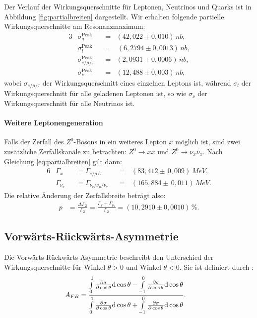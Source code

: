 Der Verlauf der Wirkungsquerschnitte für Leptonen, Neutrinos und Quarks ist in Abbildung \ref{fig:partialbreiten} dargestellt. Wir erhalten folgende partielle Wirkungsquerschnitte am Resonanzmaximum:
\begin{alignat}{3}
	&\sigma_q^\text{Peak}&&=&(42,022\pm0,010)\,\si{nb}\text{,}\\
	&\sigma_l^\text{Peak}&&=&\,(6,2794\pm0,0013)\,\si{nb}\text{,}\\
	&\sigma_{e/\mu/\tau}^\text{Peak}&&=&(2,0931\pm0,0006)\,\si{nb}\text{,}\\
	&\sigma_\nu^\text{Peak}&&=&(12,488\pm0,003)\,\si{nb}\text{,}
\end{alignat}
wobei $\sigma_{e/\mu/\tau}$ der Wirkungsquerschnitt eines einzelnen Leptons ist, während $\sigma_{l}$ der Wirkungsquerschnitt für alle geladenen Leptonen ist, so wie $\sigma_\nu$ der Wirkungsquerschnitt für alle Neutrinos ist.

\paragraph{Weitere Leptonengeneration} Falls der Zerfall des $Z^0$-Bosons in ein weiteres Lepton $x$ möglich ist, sind zwei zusätzliche Zerfallskanäle zu betrachten: $Z^0\rightarrow x\bar x$ und $Z^0\rightarrow \nu_x\bar{\nu}_x$. Nach Gleichung \ref{eq:partialbreiten} gilt dann:
\begin{alignat}{6}
	&\Gamma_x&&=\Gamma_{e/\mu/\tau}&&=&\,(83,412\pm\,0,009)\,\si{MeV}\text{,}\\
	&\Gamma_{\nu_x}&&=\Gamma_{\nu_e/\nu_\mu/\nu_\tau}&&=&\,(165,884\pm\,0,011)\,\si{MeV}\text{.}
\end{alignat}
Die relative Änderung der Zerfallsbreite beträgt also:
\begin{align}
	p&=\frac{\Delta\Gamma_Z}{\Gamma_Z}=\frac{\Gamma_x+\Gamma_{\nu_x}}{\Gamma_Z}=(10,2910\pm0,0010)\,\%\text{.}
\end{align}

\subsection{Vorwärts-Rückwärts-Asymmetrie}\label{sec:asymm}
Die Vorwärts-Rückwärts-Asymmetrie beschreibt den Unterschied der Wirkungsquerschnitte für Winkel $\theta>0$ und Winkel $\theta<0$. Sie ist definiert durch \cite{anleitungalt}:
\begin{align}
	A_{FB}&=\frac{\int\limits_0^1\del[\sigma]{\cos\theta}\mathrm d\cos\theta
		-\int\limits_{-1}^0\del[\sigma]{\cos\theta}\mathrm d\cos\theta}
	{\int\limits_0^1\del[\sigma]{\cos\theta}\mathrm d\cos\theta
		+\int\limits_{-1}^0\del[\sigma]{\cos\theta}\mathrm d\cos\theta}\text{.}\label{eq:asymm}
\end{align}


